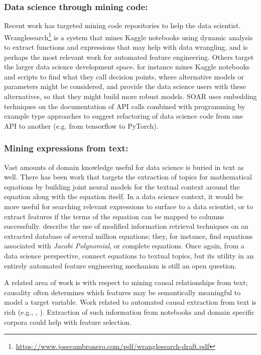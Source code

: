 \documentclass[sigconf, nonacm]{acmart}
\begin{document}
\subsubsection{Data science through mining code:}
\label{code_section}
Recent work has targeted mining code repositories to help the data scientist.  Wranglesearch\footnote{\url{https://www.josecambronero.com/pdf/wranglesearch-draft.pdf}} is a system that mines Kaggle notebooks using dynamic analysis to extract functions and expressions that may help with data wrangling, and is perhaps the most relevant work for automated feature engineering.  Others target the larger data science development space.  \cite{10.1145/3447548.3467455} for instance mines Kaggle notebooks and scripts to find what they call decision points, where alternative models or parameters might be considered, and provide the data science users with these alternatives, so that they might build more robust models.  SOAR \cite{9402016} uses embedding techniques on the documentation of API calls combined with programming by example type approaches to suggest refactoring of data science code from one API to another (e.g. from tensorflow to PyTorch).


\subsubsection{Mining expressions from text:}
\label{nlp_expression_section}
Vast amounts of domain knowledge useful for data science is buried in text as well.  There has been work that targets the extraction of topics for mathematical equations \cite{Yasunaga_Lafferty_2019} by building joint neural models for the textual context around the equation along with the equation itself.  In a data science context, it would be more useful for searching relevant expressions to surface to a data scientist, or to extract features if the terms of the equation can be mapped to columns successfully.  \cite{10.1145/3366423.3380218} describe the use of modified information retrieval techniques on an extracted database of several million equations; they, for instance, find equations associated with {\em Jacobi Polynomial}, or complete equations.  Once again, from a data science perspective, \cite{10.1145/3366423.3380218} connect equations to textual topics, but its utility in an entirely automated feature engineering mechanism is still an open question.

A related area of work is with respect to mining causal relationships from text; causality often determines which features may be semantically meaningful to model a target variable.  Work related to automated causal extraction from text is rich (e.g., \cite{LI2019512}, \cite{hassanzadeh2019answering}). Extraction of such information from notebooks and domain specific corpora could help with feature selection.
\end{document}
